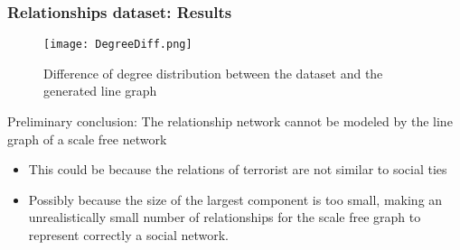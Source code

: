 \begin{frame}
\frametitle{Relationships dataset: Results}

\begin{figure}[H]
\begin{center}
\texttt{[image: DegreeDiff.png]}
\caption{Difference of degree distribution between the dataset and the generated line graph}
\label{fig:degdiff}
\end{center}
\end{figure}

Preliminary conclusion: The relationship network cannot be modeled by the line graph of a scale free network
\begin{itemize}
\item This could be because the relations of terrorist are not similar to social ties
\item Possibly because the size of the largest component is too small, making an unrealistically small number of relationships for the scale free graph to represent correctly a social network.
\end{itemize}

\end{frame}

